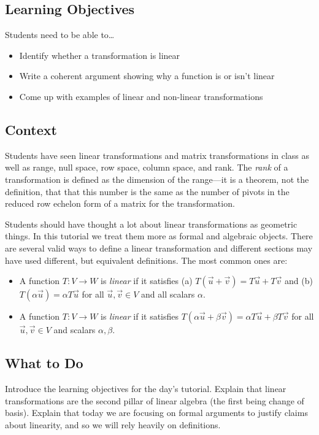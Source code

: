 \subsection*{Learning Objectives}
	Students need to be able to\ldots
	\begin{itemize}
		\item Identify whether a transformation is linear
		\item Write a coherent argument showing why a function is or isn't linear
		\item Come up with examples of linear and non-linear transformations
	\end{itemize}

\vspace*{-.5cm}
\subsection*{Context}
	Students have seen linear transformations and matrix transformations in class as well
		as range, null space, row space, column space, and rank. The \emph{rank} of a transformation
		is defined as the dimension of the range---it is a theorem, not the definition,
		that that this number is the same as the number of pivots in the reduced row
		echelon form of a matrix for the transformation.
	
	Students should have thought a lot about linear transformations as geometric things.
		In this tutorial we treat them more as formal and algebraic objects. There are
		several valid ways to define a linear transformation and different sections
		may have used different, but equivalent definitions. The most common ones are:

	\begin{itemize}
		\item A function $T:V\to W$ is \emph{linear} if it satisfies (a) $T(\vec u+\vec v)=T\vec u+T\vec v$
			and (b) $T(\alpha\vec u)=\alpha T\vec u$ for all $\vec u,\vec v\in V$ and all scalars $\alpha$.
		\item A function $T:V\to W$ is \emph{linear} if it satisfies $T(\alpha\vec u+\beta\vec v)=\alpha T\vec u+
			\beta T\vec v$ for all $\vec u,\vec v\in V$ and scalars $\alpha,\beta$.
	\end{itemize}

\vspace*{-.5cm}
\subsection*{What to Do}
	Introduce the learning objectives for the day's tutorial. Explain that linear transformations
		are the second pillar of linear algebra (the first being change of basis).
		Explain that today we are focusing on formal arguments to justify claims
		about linearity, and so we will rely heavily on definitions.

